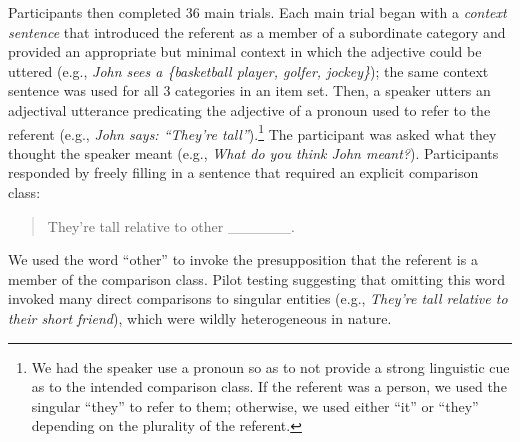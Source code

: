 \documentclass[doc]{apa6}
\begin{document}

Participants then completed 36 main trials. Each main trial began with a \emph{context sentence} that introduced the referent as a member of a subordinate category and provided an appropriate but minimal context in which the adjective could be uttered (e.g., \emph{John sees a \{basketball player, golfer, jockey\}}); the same context sentence was used for all 3 categories in an item set.
Then, a speaker utters an adjectival utterance predicating the adjective of a pronoun used to refer to the referent (e.g., \emph{John says: ``They're tall''}).\footnote{
We had the speaker use a pronoun so as to not provide a strong linguistic cue as to the intended comparison class. If the referent was a person, we used  the singular ``they'' to refer to them; otherwise, we used either ``it'' or ``they'' depending on the plurality of the referent.
}
The participant was asked what they thought the speaker meant (e.g., \emph{What do you think John meant?}). Participants responded by freely filling in a sentence that required an explicit comparison class:
\begin{quote}
They're tall relative to other \_\_\_\_\_\_.
\end{quote}
We used the word ``other'' to invoke the presupposition that the referent is a member of the comparison class. Pilot testing suggesting that omitting this word invoked many direct comparisons to singular entities (e.g., \emph{They're tall relative to their short friend}), which were wildly heterogeneous in nature.

\end{document}
